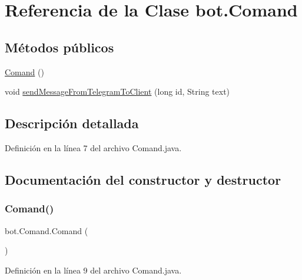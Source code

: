 \hypertarget{classbot_1_1_comand}{}\section{Referencia de la Clase bot.\+Comand}
\label{classbot_1_1_comand}
\subsection*{Métodos públicos}
\begin{DoxyCompactItemize}
\item 
\mbox{\hyperlink{classbot_1_1_comand_af81301705b36922f60e412d324db04e6}{Comand}} ()
\item 
void \mbox{\hyperlink{classbot_1_1_comand_aaf4d2683bf0d6b6d98344ca9f4071708}{send\+Message\+From\+Telegram\+To\+Client}} (long id, String text)
\end{DoxyCompactItemize}


\subsection{Descripción detallada}


Definición en la línea 7 del archivo Comand.\+java.



\subsection{Documentación del constructor y destructor}
\mbox{\label{classbot_1_1_comand_af81301705b36922f60e412d324db04e6}} 
\subsubsection{\texorpdfstring{Comand()}{Comand()}}
{\footnotesize\ttfamily bot.\+Comand.\+Comand (\begin{DoxyParamCaption}{ }\end{DoxyParamCaption})}



Definición en la línea 9 del archivo Comand.\+java.


\begin{DoxyCode}{0}

\end{DoxyCode}


